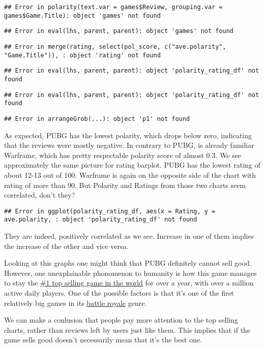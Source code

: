 \documentclass[]{article}
\begin{document}
\begin{verbatim}
## Error in polarity(text.var = games$Review, grouping.var = games$Game.Title): object 'games' not found
\end{verbatim}

\begin{verbatim}
## Error in eval(lhs, parent, parent): object 'games' not found
\end{verbatim}

\begin{verbatim}
## Error in merge(rating, select(pol_score, c("ave.polarity", "Game.Title")), : object 'rating' not found
\end{verbatim}

\begin{verbatim}
## Error in eval(lhs, parent, parent): object 'polarity_rating_df' not found
\end{verbatim}

\begin{verbatim}
## Error in eval(lhs, parent, parent): object 'polarity_rating_df' not found
\end{verbatim}

\begin{verbatim}
## Error in arrangeGrob(...): object 'p1' not found
\end{verbatim}

As expected, PUBG has the lowest polarity, which drops below zero,
indicating that the reviews were mostly negative. In contrary to PUBG,
is already familiar Warframe, which has pretty respectable polarity
score of almost 0.3. We see approximately the same picture for rating
barplot. PUBG has the lowest rating of about 12-13 out of 100. Warframe
is again on the opposite side of the chart with rating of more than 90.
But Polarity and Ratings from those two charts seem correlated, don't
they?

\begin{verbatim}
## Error in ggplot(polarity_rating_df, aes(x = Rating, y = ave.polarity, : object 'polarity_rating_df' not found
\end{verbatim}

They are indeed, positively correlated as we see. Increase in one of
them implies the increase of the other and vice versa.

Looking at this graphs one might think that PUBG definitely cannot sell
good. However, one unexplainable phonomenon to humanity is how this game
manages to stay the
\href{https://store.steampowered.com/search/?filter=topsellers}{\#1 top
selling game in the world} for over a year, with over a million active
daily players. One of the possible factors is that it's one of the first
relatively big games in its
\href{https://en.wikipedia.org/wiki/Battle_royale_game}{battle royale}
genre.

We can make a conlusion that people pay more attention to the top
selling charts, rather than reviews left by users just like them. This
implies that if the game sells good doesn't necessarily mean that it's
the best one.
\end{document}
